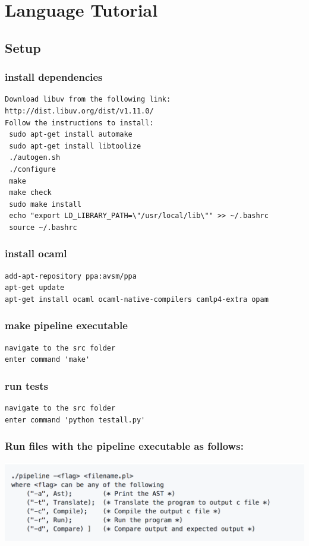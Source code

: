 \documentclass[./Report_main.tex]{subfiles}
\begin{document}


\chapter{Language Tutorial}
\section{Setup}
\subsection{install dependencies}
\begin{verbatim}
Download libuv from the following link: http://dist.libuv.org/dist/v1.11.0/
Follow the instructions to install:
 sudo apt-get install automake
 sudo apt-get install libtoolize
 ./autogen.sh
 ./configure
 make
 make check
 sudo make install
 echo "export LD_LIBRARY_PATH=\"/usr/local/lib\"" >> ~/.bashrc
 source ~/.bashrc
\end{verbatim}
\subsection{install ocaml}
\begin{verbatim}
add-apt-repository ppa:avsm/ppa
apt-get update
apt-get install ocaml ocaml-native-compilers camlp4-extra opam
\end{verbatim}
\subsection{make pipeline executable}
\begin{verbatim}
navigate to the src folder
enter command 'make'
\end{verbatim}
\subsection{run tests}
\begin{verbatim}
navigate to the src folder
enter command 'python testall.py'
\end{verbatim}
\subsection{Run files with the pipeline executable as follows:}
\includegraphics[scale = 0.5]{how_to_run}\\
\end{document}
